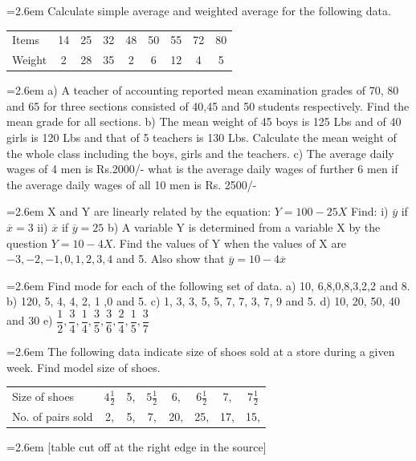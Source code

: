\documentclass[11pt,a4paper]{article}
\newcommand{\Q}[2]{\par\smallskip\noindent\hangindent=2.6em\hangafter=1
  \makebox[2.6em][l]{\textbf{#1.}}#2\par}
\newcommand{\cont}[1]{\par\noindent\hangindent=2.6em\hangafter=-100 #1}
\newcommand{\dtab}[2]{\par\smallskip\noindent\hspace*{2.6em}\begin{tabular}{#1}\hline #2\\ \hline\end{tabular}\par\smallskip}
\begin{document}
\Q{56}{Calculate simple average and weighted average for the following data.\dtab{|l@{\hspace{1.5em}}c@{\hspace{1.5em}}c@{\hspace{1.5em}}c@{\hspace{1.5em}}c@{\hspace{1.5em}}c@{\hspace{1.5em}}c@{\hspace{1.5em}}c@{\hspace{1.5em}}c|}{Items & 14 & 25 & 32 & 48 & 50 & 55 & 72 & 80 \\ Weight & 2 & 28 & 35 & 2 & 6 & 12 & 4 & 5}}
\Q{57}{a) A teacher of accounting reported mean examination grades of 70, 80 and 65 for three sections consisted of 40,45 and 50 students respectively. Find the mean grade for all sections. b) The mean weight of 45 boys is 125 Lbs and of 40 girls is 120 Lbs and that of 5 teachers is 130 Lbs. Calculate the mean weight of the whole class including the boys, girls and the teachers. c) The average daily wages of 4 men is Rs.2000/- what is the average daily wages of further 6 men if the average daily wages of all 10 men is Rs. 2500/-}
\Q{58}{X and Y are linearly related by the equation: $Y=100-25X$ Find: i) $\overline{y}$ if $\overline{x}=3$ ii) $\overline{x}$ if $\overline{y}=25$ b) A variable Y is determined from a variable X by the question $Y=10-4X$. Find the values of Y when the values of X are $-3,-2,-1,0,1,2,3,4$ and 5. Also show that $\overline{y}=10-4\overline{x}$}
\Q{59}{Find mode for each of the following set of data. a) 10, 6,8,0,8,3,2,2 and 8. b) 120, 5, 4, 4, 2, 1 ,0 and 5. c) 1, 3, 3, 5, 5, 7, 7, 3, 7, 9 and 5. d) 10, 20, 50, 40 and 30 e) $\dfrac{1}{2},\dfrac{3}{4},\dfrac{1}{4},\dfrac{3}{5},\dfrac{3}{6},\dfrac{2}{4},\dfrac{1}{5},\dfrac{3}{7}$}
\Q{60}{The following data indicate size of shoes sold at a store during a given week. Find model size of shoes.\dtab{|l@{\hspace{1.5em}}c@{\hspace{1.5em}}c@{\hspace{1.5em}}c@{\hspace{1.5em}}c@{\hspace{1.5em}}c@{\hspace{1.5em}}c@{\hspace{1.5em}}c|}{Size of shoes & $4\frac{1}{2}$ & 5, & $5\frac{1}{2}$ & 6, & $6\frac{1}{2}$ & 7, & $7\frac{1}{2}$ \\ No. of pairs sold & 2, & 5, & 7, & 20, & 25, & 17, & 15,}\cont{[table cut off at the right edge in the source]}}
\end{document}
